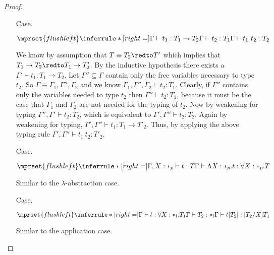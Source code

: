 \begin{proof}
\begin{itemize}
\item[Case.]\ \\
  \begin{center}
    \begin{math}
      $$\mprset{flushleft}
      \inferrule* [right=] {
        \Gamma \vdash t_1 : T_1 \rightarrow T_2 
        \\
        \Gamma \vdash t_2 : T_1
      }{\Gamma \vdash t_1\ t_2 : T_2}
    \end{math}
  \end{center}
  We know by assumption that $T \equiv T_2 \redto T'$ which implies that
  $T_1 \to T_2 \redto T_1 \to T'_2$.  By the inductive hypothesis
  there exists a $\Gamma' \vdash t_1 : T_1 \to T_2$.  Let $\Gamma'' \subseteq \Gamma$ contain
  only the free variables necessary to type $t_2$.  So $\Gamma \equiv \Gamma_1,\Gamma'',\Gamma_2$ and
  we know $\Gamma_1,\Gamma'',\Gamma_2 \vdash t_2:T_1$.  Clearly, if $\Gamma''$ contains only the
  variables needed to type $t_2$ then $\Gamma'' \vdash t_2:T_1$, because it must be the case that
  $\Gamma_1$ and $\Gamma_2$ are not needed for the typing of $t_2$.  Now by weakening for typing
  $\Gamma'',\Gamma' \vdash t_2:T_2$, which is equivalent to $\Gamma',\Gamma'' \vdash t_2:T_2$.
  Again by weakening for typing, $\Gamma',\Gamma'' \vdash t_1:T_1 \to T'_2$.  Thus,
  by applying the above typing rule $\Gamma',\Gamma'' \vdash t_1\ t_2:T'_2$.  
  
  \item[Case.]\ \\
    \begin{center}
      \begin{math}
        $$\mprset{flushleft}
        \inferrule* [right=] {
          \Gamma, X : *_p \vdash t : T
        }{\Gamma \vdash \Lambda X:*_p.t:\forall X : *_p.T}
      \end{math} 
    \end{center}
    Similar to the $\lambda$-abstraction case.

  \item[Case.]\ \\
    \begin{center}
      \begin{math}
        $$\mprset{flushleft}
        \inferrule* [right=] {
          \Gamma \vdash t:\forall X:*_l.T_1
          \\
          \Gamma \vdash T_2:*_l
        }{\Gamma \vdash t[T_2]: [T_2/X]T_1}
      \end{math}
    \end{center}
    Similar to the application case.
\end{itemize}
\end{proof}
